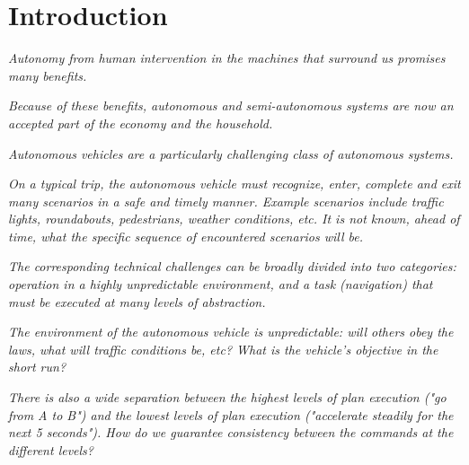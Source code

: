 \section{Introduction}
\label{introduction}

{\it Autonomy from human intervention in the machines that surround us promises many benefits.}

{\it Because of these benefits, autonomous and semi-autonomous systems are now an accepted part of the economy and the household.}

{\it Autonomous vehicles are a particularly challenging class of autonomous systems.}

{\it On a typical trip, the autonomous vehicle must recognize, enter, complete and exit many scenarios in a safe and timely manner. Example scenarios include traffic lights, roundabouts, pedestrians, weather conditions, etc. 
It is not known, ahead of time, what the specific sequence of encountered scenarios will be.}

{\it The corresponding technical challenges can be broadly divided into two categories: operation in a highly unpredictable environment, and a task (navigation) that must be executed at many levels of abstraction.}

{\it The environment of the autonomous vehicle is unpredictable: will others obey the laws, what will traffic conditions be, etc? What is the vehicle's objective in the short run?}

{\it There is also a wide separation between the highest levels of plan execution ("go from A to B") and the lowest levels of plan execution ("accelerate steadily for the next 5 seconds"). How do we guarantee consistency between the commands at the different levels?}

